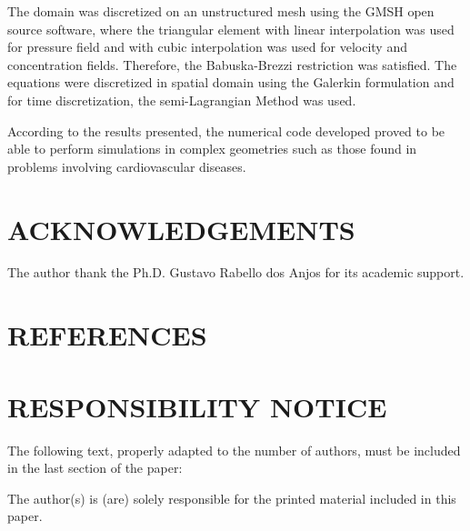 \documentclass[10pt,fleqn,a4paper,twoside]{article}
\begin{document}
\smallskip
The domain was discretized on an unstructured 
mesh using the GMSH
open source software, where the triangular element 
with linear interpolation was used for pressure field and with cubic
interpolation was used for velocity and concentration fields.
Therefore, the Babuska-Brezzi restriction was satisfied.
The equations were discretized in spatial domain 
using the Galerkin formulation and 
for time discretization, the semi-Lagrangian Method was used.

\smallskip
According to the 
results presented, 
the numerical code developed proved 
to be able to perform simulations in
complex geometries such as those found in problems 
involving cardiovascular diseases.

\smallskip



\section{ACKNOWLEDGEMENTS}
The author thank the Ph.D. Gustavo Rabello dos Anjos 
for its academic support.

\section{REFERENCES} 
\label{Sec:references}


\renewcommand{\refname}{}




\section{RESPONSIBILITY NOTICE}
The following text, properly adapted to the number of authors, must be included in the last section of the paper:

The author(s) is (are) solely responsible for the printed material included in this paper.
\end{document}
